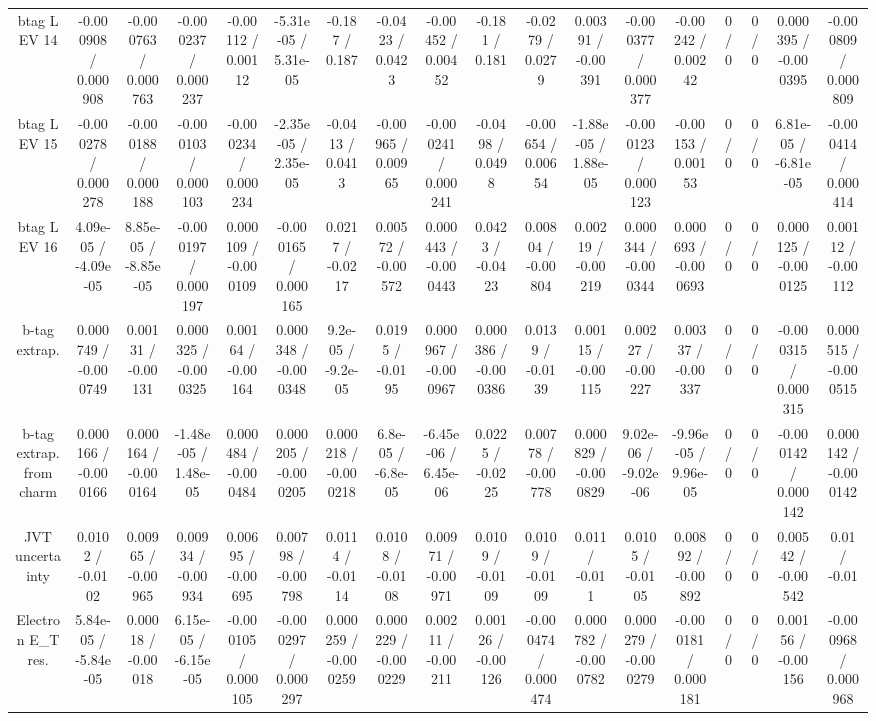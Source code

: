\documentclass[10pt]{article}
\begin{document}
\begin{table}[htbp]
\begin{center}
\begin{tabular}{|c|c|c|c|c|c|c|c|c|c|c|c|c|c|c|c|c|c|}
  btag L EV 14 & -0.000908 / 0.000908 & -0.000763 / 0.000763 & -0.000237 / 0.000237 & -0.00112 / 0.00112 & -5.31e-05 / 5.31e-05 & -0.187 / 0.187 & -0.0423 / 0.0423 & -0.00452 / 0.00452 & -0.181 / 0.181 & -0.0279 / 0.0279 & 0.00391 / -0.00391 & -0.000377 / 0.000377 & -0.00242 / 0.00242 & 0 / 0 & 0 / 0 & 0.000395 / -0.000395 & -0.000809 / 0.000809 \\ 
  btag L EV 15 & -0.000278 / 0.000278 & -0.000188 / 0.000188 & -0.000103 / 0.000103 & -0.000234 / 0.000234 & -2.35e-05 / 2.35e-05 & -0.0413 / 0.0413 & -0.00965 / 0.00965 & -0.000241 / 0.000241 & -0.0498 / 0.0498 & -0.00654 / 0.00654 & -1.88e-05 / 1.88e-05 & -0.000123 / 0.000123 & -0.00153 / 0.00153 & 0 / 0 & 0 / 0 & 6.81e-05 / -6.81e-05 & -0.000414 / 0.000414 \\ 
  btag L EV 16 & 4.09e-05 / -4.09e-05 & 8.85e-05 / -8.85e-05 & -0.000197 / 0.000197 & 0.000109 / -0.000109 & -0.000165 / 0.000165 & 0.0217 / -0.0217 & 0.00572 / -0.00572 & 0.000443 / -0.000443 & 0.0423 / -0.0423 & 0.00804 / -0.00804 & 0.00219 / -0.00219 & 0.000344 / -0.000344 & 0.000693 / -0.000693 & 0 / 0 & 0 / 0 & 0.000125 / -0.000125 & 0.00112 / -0.00112 \\ 
  b-tag extrap. & 0.000749 / -0.000749 & 0.00131 / -0.00131 & 0.000325 / -0.000325 & 0.00164 / -0.00164 & 0.000348 / -0.000348 & 9.2e-05 / -9.2e-05 & 0.0195 / -0.0195 & 0.000967 / -0.000967 & 0.000386 / -0.000386 & 0.0139 / -0.0139 & 0.00115 / -0.00115 & 0.00227 / -0.00227 & 0.00337 / -0.00337 & 0 / 0 & 0 / 0 & -0.000315 / 0.000315 & 0.000515 / -0.000515 \\ 
  b-tag extrap. from charm & 0.000166 / -0.000166 & 0.000164 / -0.000164 & -1.48e-05 / 1.48e-05 & 0.000484 / -0.000484 & 0.000205 / -0.000205 & 0.000218 / -0.000218 & 6.8e-05 / -6.8e-05 & -6.45e-06 / 6.45e-06 & 0.0225 / -0.0225 & 0.00778 / -0.00778 & 0.000829 / -0.000829 & 9.02e-06 / -9.02e-06 & -9.96e-05 / 9.96e-05 & 0 / 0 & 0 / 0 & -0.000142 / 0.000142 & 0.000142 / -0.000142 \\ 
  JVT uncertainty & 0.0102 / -0.0102 & 0.00965 / -0.00965 & 0.00934 / -0.00934 & 0.00695 / -0.00695 & 0.00798 / -0.00798 & 0.0114 / -0.0114 & 0.0108 / -0.0108 & 0.00971 / -0.00971 & 0.0109 / -0.0109 & 0.0109 / -0.0109 & 0.011 / -0.011 & 0.0105 / -0.0105 & 0.00892 / -0.00892 & 0 / 0 & 0 / 0 & 0.00542 / -0.00542 & 0.01 / -0.01 \\ 
  Electron E_{T} res. & 5.84e-05 / -5.84e-05 & 0.00018 / -0.00018 & 6.15e-05 / -6.15e-05 & -0.000105 / 0.000105 & -0.000297 / 0.000297 & 0.000259 / -0.000259 & 0.000229 / -0.000229 & 0.00211 / -0.00211 & 0.00126 / -0.00126 & -0.000474 / 0.000474 & 0.000782 / -0.000782 & 0.000279 / -0.000279 & -0.000181 / 0.000181 & 0 / 0 & 0 / 0 & 0.00156 / -0.00156 & -0.000968 / 0.000968 \\ 

\end{tabular}
\end{center}
\end{table}
\end{document}
